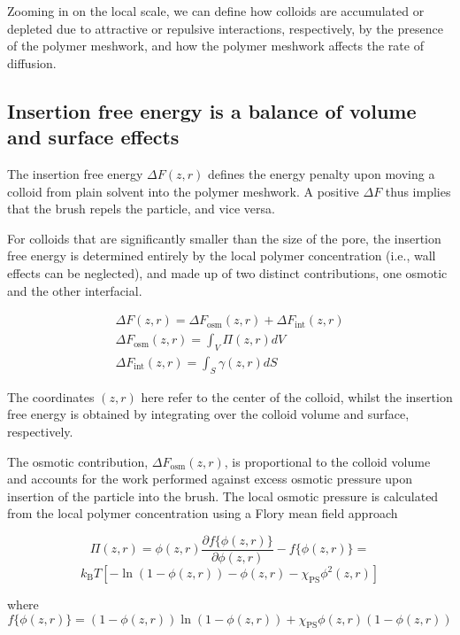 \documentclass[12pt, a4paper]{article}
\begin{document}
Zooming in on the local scale, we can define how colloids are accumulated or depleted due to attractive or repulsive interactions, respectively, by the presence of the polymer meshwork, 
and how the polymer meshwork affects the rate of diffusion.

\subsection{Insertion free energy is a balance of volume and surface effects}

The insertion free energy $\Delta F(z,r)$ defines the energy penalty upon moving a colloid from plain solvent into the polymer meshwork.
A positive $\Delta F$ thus implies that the brush repels the particle, and vice versa.

For colloids that are significantly smaller than the size of the pore, the insertion free energy is determined entirely by the local polymer concentration (i.e., wall effects can be neglected), 
and made up of two distinct contributions, one osmotic and the other interfacial.

\begin{eqnarray}
    \Delta F (z,r)= \Delta F_{\text{osm}}(z,r) + \Delta F_{\text{int}}(z,r)
    \\
    \Delta F_{\text{osm}}(z,r) = \int_{V} \Pi(z,r) dV
    \\
    \Delta F_{\text{int}}(z,r) = \int_{S} \gamma (z,r) dS
    \label{eq:Delta_F}
\end{eqnarray}

\noindent The coordinates $(z,r)$ here refer to the center of the colloid, whilst the insertion free energy is obtained by integrating over the colloid volume and surface, respectively.

The osmotic contribution, $\Delta F_{\text{osm}}(z,r)$, is proportional to the colloid volume 
and accounts for the work performed against excess osmotic pressure upon insertion of the particle into the brush. 
The local osmotic pressure is calculated from the local polymer concentration using a Flory mean field approach 

$$
\Pi(z,r)=  \phi(z,r)\frac{\partial f\{\phi(z,r)\}}{\partial \phi(z,r)} - f\{\phi(z,r)\}= 
$$
\begin{equation}
	k_{\text{B}}T[-\ln(1-\phi(z,r)) - \phi(z,r) -\chi_{\text{PS}}\phi^2(z,r)]
\end{equation}

\noindent where
$$
f\{\phi(z,r)\}=(1-\phi(z,r))\ln(1-\phi(z,r)) +\chi_{\text{PS}}\phi(z,r)(1-\phi(z,r))
$$
\end{document}
